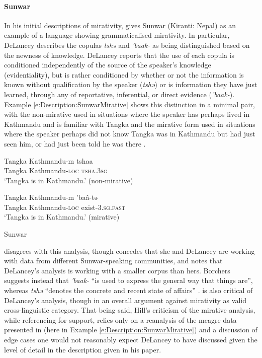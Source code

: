 \paragraph{Sunwar}
In his initial descriptions of mirativity,  gives Sunwar (Kiranti: Nepal) as an example of a language showing grammaticalised mirativity. In particular, DeLancey describes the copulas \textit{tshə} and \textit{'baak-} as being distinguished based on the newness of knowledge. DeLancey reports that the use of each copula is conditioned independently of the source of the speaker's knowledge (evidentiality), but is rather conditioned by whether or not the information is known without qualification by the speaker (\textit{tshə}) or is information they have just learned, through any of reportative, inferential, or direct evidence (\textit{'baak-}). Example \ref{e:Description:SunwarMirative} shows this distinction in a minimal pair, with the non-mirative used in situations where the speaker has perhaps lived in Kathmandu and is familiar with Tangka and the mirative form used in situations where the speaker perhaps did not know Tangka was in Kathmandu but had just seen him, or had just been told he was there \cite[42]{DeLanceyMirativity1997}.

\begin{exe}
        \ex\label{e:Description:SunwarMirative}
        \begin{xlist}
                \ex 
                \gll Tangka Kathmandu-m tshaa \\
                Tangka Kathmandu-\textsc{loc} \textsc{tsha.3sg} \\
                \glt `Tangka is in Kathmandu.' (non-mirative)

                \ex
                \gll Tangka Kathmandu-m 'baâ-tə \\
                Tangka Kathmandu-\textsc{loc} exist-\textsc{3.sg.past} \\
                \glt `Tangka is in Kathmandu.' (mirative)
        \end{xlist}
        Sunwar \cite[Kiranti: Nepal,][41-42]{DeLanceyMirativity1997}
\end{exe}

 disagrees with this analysis, though concedes that she and DeLancey are working with data from different Sunwar-speaking communities, and notes that DeLancey's analysis is working with a smaller corpus than hers. Borchers suggests instead that \textit{'baak-} ``is used to express the general way that things are'', whereas \textit{tshə} ``denotes the concrete and recent state of affairs'' \cite[164]{Borchers2008}.  is also critical of DeLancey's analysis, though in an overall argument against mirativity as valid cross-linguistic category. That being said, Hill's criticism of the mirative analysis, while referencing  for support, relies only on a reanalysis of the meagre data presented in  (here in Example \ref{e:Description:SunwarMirative}) and a discussion of edge cases one would not reasonably expect DeLancey to have discussed given the level of detail in the description given in his paper.


